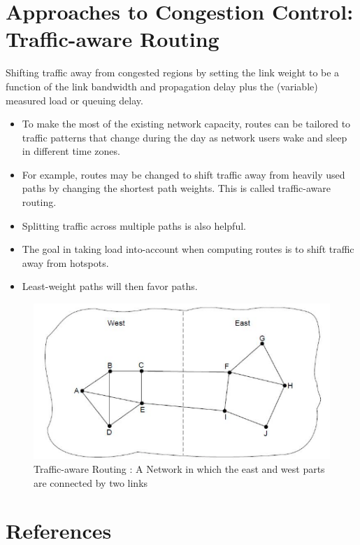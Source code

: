 \documentclass[twoside]{article}
\def\beginrefs{\begin{list}%
        {[\arabic{equation}]}{\usecounter{equation}
         \setlength{\leftmargin}{2.0truecm}\setlength{\labelsep}{0.4truecm}%
         \setlength{\labelwidth}{1.6truecm}}}
\def\bibentry#1{\item[\hbox{[#1]}]}
\begin{document}
\section*{Approaches to Congestion Control: Traffic-aware Routing}
Shifting traffic away from congested regions by setting the link weight to be a function of the link bandwidth and propagation delay plus the (variable) measured load or queuing delay.
\begin{itemize}
    \item To make the most of the existing network capacity, routes can be
tailored to traffic patterns that change during the day as network
users wake and sleep in different time zones.
    \item For example, routes may be changed to shift traffic away from heavily
used paths by changing the shortest path weights. This is called
traffic-aware routing.
    \item Splitting traffic across multiple paths is also helpful.
    \item The goal in taking load into-account when computing routes is to shift traffic away from hotspots.
    \item Least-weight paths will then favor paths.
\end{itemize}
\newline  \begin{figure}
    \centering
    \includegraphics[width=\textwidth]{images/cct.png}
    \caption{Traffic-aware Routing : A Network in which the east and west parts are connected by two links}
\end{figure}
\newpage \section*{References}
\end{document}
